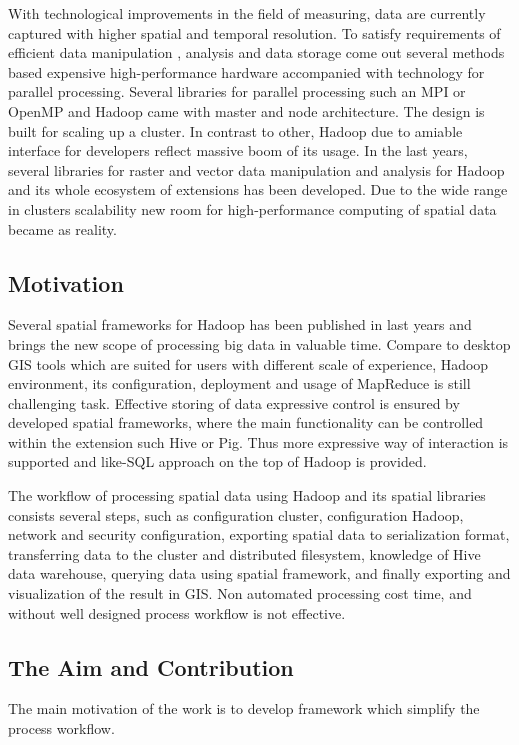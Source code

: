 \documentclass[a4paper,12pt,oneside]{report}
\begin{document}
	With technological improvements in the field of measuring, 
	data are currently captured with higher spatial and temporal resolution. To satisfy requirements of
	efficient data manipulation
	, analysis and data storage come out several methods based	expensive high-performance hardware
	 accompanied with technology for parallel
	processing. Several libraries for parallel processing such an MPI or OpenMP and
	Hadoop came with master and node  architecture. The design is built for scaling up a cluster.
	 In contrast to other, Hadoop due to amiable interface for
	developers reflect massive boom of its usage. In the last years, several libraries for raster
	and vector data manipulation and analysis for Hadoop and its
	whole ecosystem of extensions has been developed.	Due to the wide range in clusters
	scalability new room for high-performance computing of spatial data became
	as reality.
	
	
	\subsection*{Motivation}
	Several spatial frameworks for Hadoop has been published in last years and
	brings the new 	
	scope of  processing big data in valuable time. Compare to desktop GIS tools
	which are suited for users with different scale of experience, Hadoop
	environment, its configuration, deployment and usage of MapReduce is still
	challenging task. Effective storing of data expressive control is ensured by developed spatial
	frameworks, where the  main functionality can be controlled within the extension such Hive or Pig. 
	Thus more expressive way of interaction is supported and like-SQL
	approach on the top of Hadoop is provided. 
	
	The workflow of processing spatial data using  Hadoop and its spatial libraries
	consists several steps, such as configuration cluster, configuration Hadoop,
	network and security configuration, exporting spatial data to serialization
	format, transferring data to the cluster and distributed filesystem, knowledge
	of Hive data warehouse, querying data using spatial framework, and  finally
	exporting and visualization of the result in GIS. Non automated processing cost time, and
	without well designed process workflow is not effective.
	
	
	\subsection*{The Aim and Contribution}
	The main motivation of the work is to develop framework which simplify the
	process workflow. 
	
\end{document}
